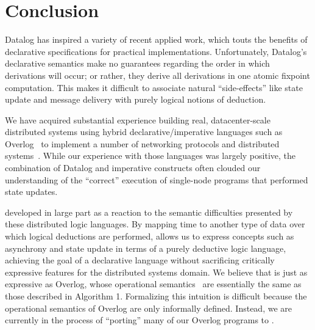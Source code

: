 \section{Conclusion}



Datalog has inspired a variety of recent applied work, which touts the benefits of declarative specifications for practical implementations.  Unfortunately, Datalog's declarative semantics make no guarantees
regarding the order in which derivations will occur; or rather, they derive all derivations in one atomic fixpoint computation.  This makes it difficult to associate natural ``side-effects'' like state update and message delivery with purely logical notions of deduction.


We have acquired substantial experience building real, datacenter-scale
distributed systems using hybrid
declarative/imperative languages such as Overlog~\cite{Loo2009-CACM}
to implement a number of networking protocols and distributed
systems~\cite{boom-techr,Alvaro2009I-Do-Declare:-C,Chu:2007,Loo2009-CACM}.
While our experience with those languages was largely positive, the 
combination of Datalog and imperative constructs 
often clouded  our understanding of the
``correct'' execution of single-node programs that performed state
updates.  

\lang developed in large part as a reaction to the semantic difficulties
presented by these distributed logic languages.  
By mapping time to another type of data over which logical deductions
are performed, \lang allows us to express concepts such as asynchrony and state update in terms of a purely deductive logic
language, achieving the goal of a declarative language without sacrificing critically expressive features for the distributed systems domain.
We believe that \lang is just as expressive as Overlog, whose operational semantics~\cite{boom-tr} are essentially the same
as those described in Algorithm 1.  Formalizing this intuition is difficult because the operational semantics of Overlog are only informally
defined.  Instead, we are currently in the process of ``porting'' many of our Overlog programs to \lang.


